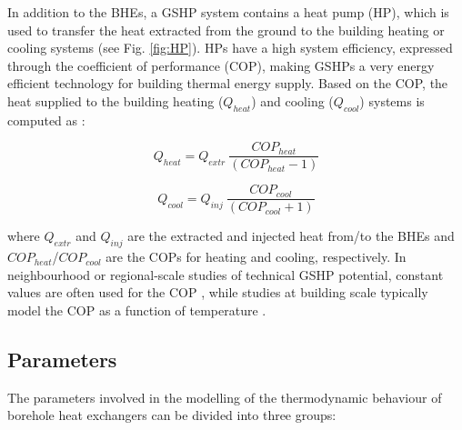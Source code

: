 In addition to the BHEs, a GSHP system contains a heat pump (HP), which is used to transfer the heat extracted from the ground to the building heating or cooling systems (see Fig. \ref{fig:HP}).
HPs have a high system efficiency, expressed through the coefficient of performance (COP), making GSHPs a very energy efficient technology for building thermal energy supply. Based on the COP, the heat supplied to the building heating ($Q_\mathit{heat}$) and cooling ($Q_\mathit{cool}$) systems is computed as \cite{kavanaugh_geothermal_2014}: 

\begin{equation}
\label{eq:COP_heat}
Q_\mathit{heat}=Q_\mathit{extr}\ \frac{COP_\mathit{heat}}{\left(COP_\mathit{heat}-1\right)}
\end{equation}

\begin{equation}
\label{eq:COP_cool}
Q_\mathit{cool}=Q_\mathit{inj}\ \frac{COP_\mathit{cool}}{\left(COP_\mathit{cool}+1\right)}
\end{equation}

where $Q_\mathit{extr}$ and $Q_\mathit{inj}$ are the extracted and injected heat from/to the BHEs and $COP_\mathit{heat}$/$COP_\mathit{cool}$ are the COPs for heating and cooling, respectively. In neighbourhood or regional-scale studies of technical GSHP potential, constant values are often used for the COP \cite{miglani_methodology_2018,schiel_gis-based_2016,perego_techno-economic_2019}, while studies at building scale typically model the COP as a function of temperature \cite{fraga_heat_2018,liu_feasibility_2017,stene_residential_2005}.

\subsection{Parameters}
\label{geo_params}
The parameters involved in the modelling of the thermodynamic behaviour of borehole heat exchangers can be divided into three groups: 

